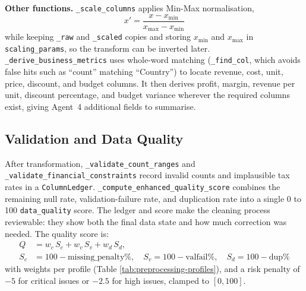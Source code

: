 \documentclass[12pt,a4paper,openany]{report}
\begin{document}
\textbf{Other functions.} \texttt{\_scale\_columns} applies Min-Max normalisation,
\begin{equation}
x' = \frac{x - x_{\min}}{x_{\max} - x_{\min}}
\label{eq:minmax}
\end{equation}
while keeping \texttt{\_raw} and \texttt{\_scaled} copies and storing $x_{\min}$ and $x_{\max}$ in \texttt{scaling\_params}, so the transform can be inverted later. \texttt{\_derive\_business\_metrics} uses whole-word matching (\texttt{\_find\_col}, which avoids false hits such as ``count'' matching ``Country'') to locate revenue, cost, unit, price, discount, and budget columns. It then derives profit, margin, revenue per unit, discount percentage, and budget variance wherever the required columns exist, giving Agent~4 additional fields to summarise.

\subsection{Validation and Data Quality}
After transformation, \texttt{\_validate\_count\_ranges} and \texttt{\_validate\_financial\_constraints} record invalid counts and implausible tax rates in a \texttt{ColumnLedger}. \texttt{\_compute\_enhanced\_quality\_score} combines the remaining null rate, validation-failure rate, and duplication rate into a single 0 to 100 \texttt{data\_quality} score. The ledger and score make the cleaning process reviewable: they show both the final data state and how much correction was needed. The quality score is:
\begin{equation}
\begin{aligned}
Q &= w_{c}\,S_{c} + w_{v}\,S_{v} + w_{d}\,S_{d}, \\
S_c &= 100 - \text{missing\_penalty\%}, \quad S_v = 100 - \text{valfail\%}, \quad S_d = 100 - \text{dup\%}
\end{aligned}
\label{eq:quality-score}
\end{equation}
with weights per profile (Table \ref{tab:preprocessing-profiles}), and a risk penalty of $-5$ for critical issues or $-2.5$ for high issues, clamped to $[0,100]$.
\end{document}
